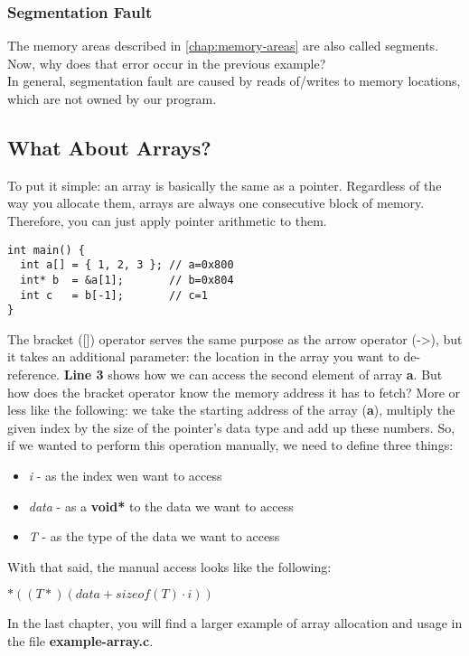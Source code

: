 \documentclass{article}
\begin{document}
  \subsubsection{Segmentation Fault}
  The memory areas described in \autoref{chap:memory-areas} are also called segments.
  Now, why does that error occur in the previous example?
  \\In general, segmentation fault are caused by reads of/writes to memory locations, which are not owned by our program.
  
  
  \subsection{What About Arrays?}
  To put it simple: an array is basically the same as a pointer.
  Regardless of the way you allocate them, arrays are always one consecutive block of memory.
  Therefore, you can just apply pointer arithmetic to them.
  \begin{lstlisting}
int main() {
  int a[] = { 1, 2, 3 }; // a=0x800
  int* b  = &a[1];       // b=0x804
  int c   = b[-1];       // c=1
}
  \end{lstlisting}
  The bracket ([]) operator serves the same purpose as the arrow operator (->), but it takes an additional parameter: the location in the array you want to de-reference.
  \textbf{Line 3} shows how we can access the second element of array \textbf{a}.
  But how does the bracket operator know the memory address it has to fetch?
  More or less like the following: we take the starting address of the array (\textbf{a}), multiply the given index by the size of the pointer's data type and add up these numbers.
  So, if we wanted to perform this operation manually, we need to define three things:
  \begin{itemize}
    \item \textit{i} - as the index wen want to access
    \item \textit{data} - as a \textbf{void*} to the data we want to access
    \item \textit{T} - as the type of the data we want to access
  \end{itemize}
  With that said, the manual access looks like the following:
  \begin{center}
    $*((\textit{T}*)(\textit{data} + sizeof(\textit{T}) \cdot \textit{i}))$
  \end{center}
  In the last chapter, you will find a larger example of array allocation and usage in the file \textbf{example-array.c}.
  
\end{document}
